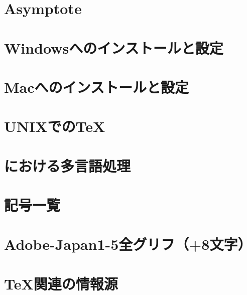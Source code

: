 \documentclass{jsbook}
\begin{document}
\chapter{Asymptote}

\chapter{Windowsへのインストールと設定}

\chapter{Macへのインストールと設定}

\chapter{UNIXでのTeX}

\chapter{\LaTeXe における多言語処理}

\chapter{記号一覧}

\chapter{Adobe-Japan1-5全グリフ（+8文字）}

\chapter{\TeX 関連の情報源}
\end{document}
